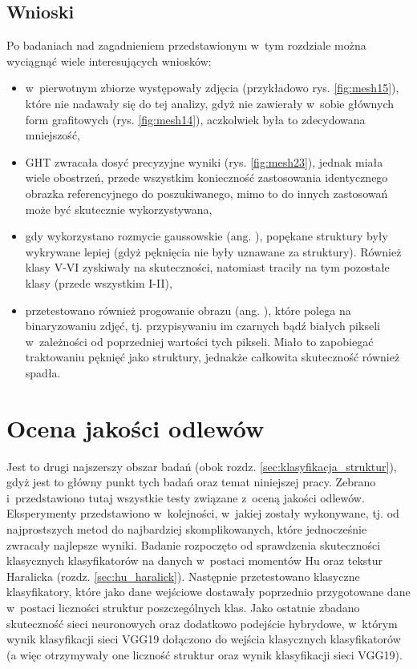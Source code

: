 \subsection{Wnioski}
\label{klasyfikacja.struktur.wnioski}

Po badaniach nad zagadnieniem przedstawionym w~tym rozdziale można wyciągnąć wiele interesujących wniosków:
\begin{itemize}
	\item w~pierwotnym zbiorze występowały zdjęcia (przykładowo rys. \ref{fig:mesh15}), które nie nadawały się do tej analizy, gdyż nie zawierały w~sobie głównych form grafitowych (rys. \ref{fig:mesh14}), aczkolwiek była to zdecydowana mniejszość,
	\item GHT zwracała dosyć precyzyjne wyniki (rys. \ref{fig:mesh23}), jednak miała wiele obostrzeń, przede wszystkim konieczność zastosowania identycznego obrazka referencyjnego do poszukiwanego, mimo to do innych zastosowań może być skutecznie wykorzystywana,
	\item gdy wykorzystano rozmycie gaussowskie (ang. ), popękane struktury były wykrywane lepiej (gdyż pęknięcia nie były uznawane za struktury). Również klasy V-VI zyskiwały na skuteczności, natomiast traciły na tym pozostałe klasy (przede wszystkim I-II),
	\item przetestowano również progowanie obrazu (ang. ), które polega na binaryzowaniu zdjęć, tj. przypisywaniu im czarnych bądź białych pikseli w~zależności od poprzedniej wartości tych pikseli. Miało to zapobiegać traktowaniu pęknięć jako struktury, jednakże całkowita skuteczność również spadła.
\end{itemize}

\section{Ocena jakości odlewów}
\label{Ocena jakości odlewów}

Jest to drugi najszerszy obszar badań (obok rozdz. \ref{sec:klasyfikacja_struktur}), gdyż jest to główny punkt tych badań oraz temat niniejszej pracy. Zebrano i~przedstawiono tutaj wszystkie testy związane z~oceną jakości odlewów. Eksperymenty przedstawiono w~kolejności, w~jakiej zostały wykonywane, tj. od najprostszych metod do najbardziej skomplikowanych, które jednocześnie zwracały najlepsze wyniki. Badanie rozpoczęto od sprawdzenia skuteczności klasycznych klasyfikatorów na danych w~postaci momentów Hu oraz tekstur Haralicka (rozdz. \ref{sec:hu_haralick}). Następnie przetestowano klasyczne klasyfikatory, które jako dane wejściowe dostawały poprzednio przygotowane dane w~postaci liczności struktur poszczególnych klas. Jako ostatnie zbadano skuteczność sieci neuronowych oraz dodatkowo podejście hybrydowe, w~którym wynik klasyfikacji sieci VGG19 dołączono do wejścia klasycznych klasyfikatorów (a więc otrzymywały one liczność struktur oraz wynik klasyfikacji sieci VGG19). 

